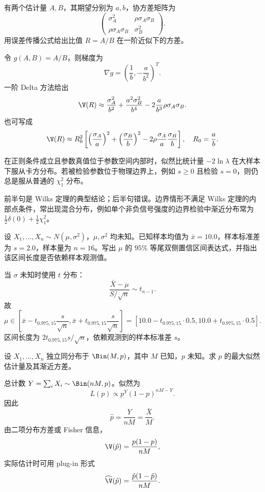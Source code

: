 \begin{question}
有两个估计量 $A,B$，其期望分别为 $a,b$，协方差矩阵为
\[
\begin{pmatrix}
\sigma_A^2&\rho\sigma_A\sigma_B\\
\rho\sigma_A\sigma_B&\sigma_B^2
\end{pmatrix}.
\]
用误差传播公式给出比值 $R=A/B$ 在一阶近似下的方差。
\begin{solution}
令 $g(A,B)=A/B$，则梯度为
\[
\nabla g=\left(\frac1b,-\frac a{b^2}\right)^T.
\]
一阶 Delta 方法给出
\[
\V(R)\approx
\frac{\sigma_A^2}{b^2}+\frac{a^2\sigma_B^2}{b^4}
-2\frac{a}{b^3}\rho\sigma_A\sigma_B.
\]
也可写成
\[
\V(R)\approx R_0^2\left[
\left(\frac{\sigma_A}{a}\right)^2+
\left(\frac{\sigma_B}{b}\right)^2
-2\rho\frac{\sigma_A}{a}\frac{\sigma_B}{b}
\right],
\quad R_0=\frac ab.
\]
\end{solution}
\end{question}

\begin{question}[判断题]
在正则条件成立且参数真值位于参数空间内部时，似然比统计量 $-2\ln\lambda$ 在大样本下服从卡方分布。若被检验参数位于物理边界上，例如 $s\ge0$ 且检验 $s=0$，则仍总是服从普通的 $\chi^2_1$ 分布。
\begin{solution}
前半句是 Wilks 定理的典型结论；后半句错误。边界情形不满足 Wilks 定理的内部点条件，常出现混合分布，例如单个非负信号强度的边界检验中渐近分布常为 $\frac12\delta(0)+\frac12\chi^2_1$。
\end{solution}
\end{question}

\begin{question}
设 $X_1,\ldots,X_n\sim N(\mu,\sigma^2)$，$\mu,\sigma^2$ 均未知。已知样本均值为 $\bar x=10.0$，样本标准差为 $s=2.0$，样本量为 $n=16$。写出 $\mu$ 的 $95\%$ 等尾双侧置信区间表达式，并指出该区间长度是否依赖样本观测值。
\begin{solution}
当 $\sigma$ 未知时使用 $t$ 分布：
\[
\frac{\bar X-\mu}{S/\sqrt n}\sim t_{n-1}.
\]
故
\[
\mu\in\left[\bar x-t_{0.975,15}\frac{s}{\sqrt n},
\bar x+t_{0.975,15}\frac{s}{\sqrt n}\right]
=\left[10.0-t_{0.975,15}\cdot0.5,
10.0+t_{0.975,15}\cdot0.5\right].
\]
区间长度为 $2t_{0.975,15}s/\sqrt n$，依赖观测到的样本标准差 $s$。
\end{solution}
\end{question}

\begin{question}
设 $X_1,\ldots,X_n$ 独立同分布于 $\Bin(M,p)$，其中 $M$ 已知，$p$ 未知。求 $p$ 的最大似然估计量及其渐近方差。
\begin{solution}
总计数 $Y=\sum_iX_i\sim\Bin(nM,p)$。似然为
\[
L(p)\propto p^Y(1-p)^{nM-Y}.
\]
因此
\[
\hat p=\frac{Y}{nM}=\frac{\bar X}{M}.
\]
由二项分布方差或 Fisher 信息，
\[
\V(\hat p)=\frac{p(1-p)}{nM},
\]
实际估计时可用 plug-in 形式
\[
\widehat{\V}(\hat p)=\frac{\hat p(1-\hat p)}{nM}.
\]
\end{solution}
\end{question}
